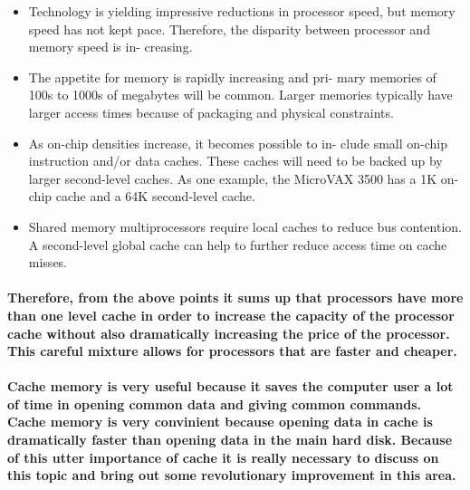 \documentclass{article}
\begin{document}
\begin{itemize}

    \item Technology is yielding impressive reductions in processor
    speed, but memory speed has not kept pace. Therefore,
    the disparity between processor and memory speed is in-
    creasing.

    \item The appetite for memory is rapidly increasing and pri-
    mary memories of 100s to 1000s of megabytes will be
    common. Larger memories typically have larger access
    times because of packaging and physical constraints.

    \item As on-chip densities increase, it becomes possible to in-
    clude small on-chip instruction and/or data caches. These caches will need to be backed up by larger
    second-level caches. As one example, the MicroVAX 3500
    has a 1K on-chip cache and a 64K second-level cache.

    \item Shared memory multiprocessors require local caches to
    reduce bus contention. A second-level global cache can
    help to further reduce access time on cache misses.
    
\end{itemize}

\paragraph{Therefore, from the above points it sums up that processors have more than
 one level cache in order to increase the capacity of the processor cache without also
 dramatically increasing the price of the processor. This careful mixture allows for 
 processors that are faster and cheaper. 
}

\paragraph{Cache memory is very useful because it saves the computer user a lot of time in 
    opening common data and giving common commands. Cache memory is very convinient 
    because opening data in cache is dramatically faster than opening data in the main 
    hard disk. Because of this utter importance of cache it is really necessary to discuss 
    on this topic and bring out some revolutionary improvement in this area.
}
\end{document}
